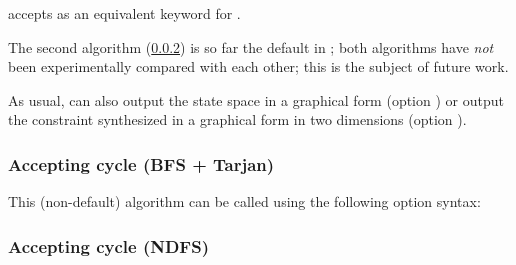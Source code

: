 \begin{syntaxalias}
	\imitator{} accepts  as an equivalent keyword for .
\end{syntaxalias}



The second algorithm (\cref{sss:accepting-loop-NDFS}) is so far the default in \imitator{}; both algorithms have \emph{not} been experimentally compared with each other; this is the subject of future work.


As usual, \imitator{} can also
output the state space in a graphical form (option )
or
output the constraint synthesized in a graphical form in two dimensions (option ).


\subsubsection{Accepting cycle (BFS + Tarjan)}\label{sss:accepting-loop-BFS}

This (non-default) algorithm can be called using the following option syntax:



\subsubsection{Accepting cycle (NDFS)}\label{sss:accepting-loop-NDFS}

